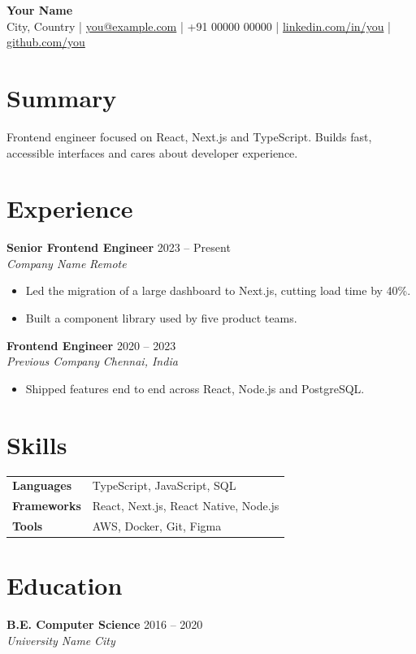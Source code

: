 \documentclass[10.5pt]{article}
\newcommand{\role}[4]{%
  \textbf{#1} \hfill #4\\
  \textit{#2} \hfill \textit{#3}\par\vspace{2pt}}
\begin{document}
\begin{center}
  {\LARGE\bfseries Your Name}\\[4pt]
  City, Country \;|\; \href{mailto:you@example.com}{you@example.com} \;|\;
  +91 00000 00000 \;|\; \href{https://linkedin.com/in/you}{linkedin.com/in/you} \;|\;
  \href{https://github.com/you}{github.com/you}
\end{center}

\section{Summary}
Frontend engineer focused on React, Next.js and TypeScript. Builds fast, accessible
interfaces and cares about developer experience.

\section{Experience}
\role{Senior Frontend Engineer}{Company Name}{Remote}{2023 -- Present}
\begin{itemize}
  \item Led the migration of a large dashboard to Next.js, cutting load time by 40\%.
  \item Built a component library used by five product teams.
\end{itemize}

\role{Frontend Engineer}{Previous Company}{Chennai, India}{2020 -- 2023}
\begin{itemize}
  \item Shipped features end to end across React, Node.js and PostgreSQL.
\end{itemize}

\section{Skills}
\begin{tabularx}{\linewidth}{@{}l X@{}}
  \textbf{Languages} & TypeScript, JavaScript, SQL \\
  \textbf{Frameworks} & React, Next.js, React Native, Node.js \\
  \textbf{Tools} & AWS, Docker, Git, Figma \\
\end{tabularx}

\section{Education}
\role{B.E. Computer Science}{University Name}{City}{2016 -- 2020}
\end{document}
